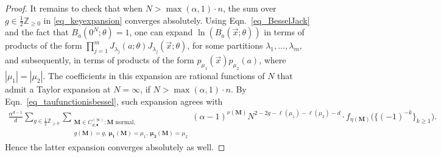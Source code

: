 \documentclass[11pt]{article}
\theoremstyle{plain}
\newcommand{\Z}{\mathbb Z}
\newcommand{\la}{\lambda}
\newcommand{\MM}{\mathbf M}
\newcommand{\vecx}{\vec{x}}
\begin{document}
\begin{proof}
It remains to check that when $N>\max(\alpha,1)\cdot n$, the sum over $g\in\frac{1}{2}\Z_{\ge 0}$ in \eqref{eq_keyexpansion} converges absolutely.
Using Eqn.~\eqref{eq_BesselJack} and the fact that $B_a(0^{N};\theta)=1$, one can expand $\ln\left( B_a(\vecx;\theta)\right)$ in terms of products of the form $\prod_{j=1}^{m}J_{\la_{j}}(a;\theta)J_{\la_j}(\vecx;\theta)$, for some partitions $\la_1,\dots,\la_m$, and subsequently, in terms of products of the form $p_{\mu_{1}}(\vecx)p_{\mu_{2}}(a)$, where $|\mu_{1}|=|\mu_{2}|$.
The coefficients in this expansion are rational functions of $N$ that admit a Taylor expansion at $N=\infty$, if $N>\max(\alpha,1)\cdot n$. By Eqn.~\eqref{eq_taufunctionisbessel}, such expansion agrees with 
\begin{multline*}
    \frac{\alpha^{d-1}}{d}\sum_{g\in \frac{1}{2}\Z_{\ge 0}} \sum_{\substack{\MM\in C^{(\infty)}_{d,\bullet}\colon \MM\text{ normal},\\ g(\MM)=g,\ \pmb{\mu_{1}}(\MM)=\mu_1,\ \pmb{\mu_2}(\MM)=\mu_2}}
    (\alpha-1)^{\nu(\MM)}
    N^{2-2g-\ell(\mu_1)-\ell(\mu_2)-d}\cdot f_{\eta(\MM)}\Big(\big\{(-1)^{-k}\big\}_{k\ge 1}\Big). 
\end{multline*}
Hence the latter expansion converges absolutely as well.
\end{proof}
\end{document}
